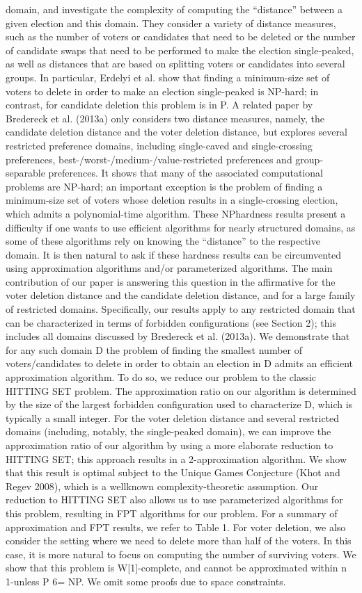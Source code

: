 \documentclass[11pt]{article}
\begin{document}
{domain, and investigate the complexity of computing the ``distance'' between a
given election and this domain. They consider a variety of distance measures,
such as the number of voters or candidates that need to be deleted or the number
of candidate swaps that need to be performed to make the election single-peaked,
as well as distances that are based on splitting voters or candidates into
several groups. In particular, Erdelyi et al. show that finding a minimum-size
set of voters to delete in order to make an election single-peaked is NP-hard; in
contrast, for candidate deletion this problem is in P. A related paper by
Bredereck et al. (2013a) only considers two distance measures, namely, the
candidate deletion distance and the voter deletion distance, but explores several
restricted preference domains, including single-caved and single-crossing
preferences, best-/worst-/medium-/value-restricted preferences and
group-separable preferences. It shows that many of the associated computational
problems are NP-hard; an important exception is the problem of finding a
minimum-size set of voters whose deletion results in a single-crossing election,
which admits a polynomial-time algorithm. These NPhardness results present a
difficulty if one wants to use efficient algorithms for nearly structured
domains, as some of these algorithms rely on knowing the ``distance'' to the
respective domain. It is then natural to ask if these hardness results can be
circumvented using approximation algorithms and/or parameterized algorithms. The
main contribution of our paper is answering this question in the affirmative for
the voter deletion distance and the candidate deletion distance, and for a large
family of restricted domains. Specifically, our results apply to any restricted
domain that can be characterized in terms of forbidden configurations (see
Section 2); this includes all domains discussed by Bredereck et al. (2013a). We
demonstrate that for any such domain D the problem of finding the smallest number
of voters/candidates to delete in order to obtain an election in D admits an
efficient approximation algorithm. To do so, we reduce our problem to the classic
HITTING SET problem. The approximation ratio on our algorithm is determined by
the size of the largest forbidden configuration used to characterize D, which is
typically a small integer. For the voter deletion distance and several restricted
domains (including, notably, the single-peaked domain), we can improve the
approximation ratio of our algorithm by using a more elaborate reduction to
HITTING SET; this approach results in a 2-approximation algorithm. We show that
this result is optimal subject to the Unique Games Conjecture (Khot and Regev
2008), which is a wellknown complexity-theoretic assumption. Our reduction to
HITTING SET also allows us to use parameterized algorithms for this problem,
resulting in FPT algorithms for our problem. For a summary of approximation and
FPT results, we refer to Table 1. For voter deletion, we also consider the
setting where we need to delete more than half of the voters. In this case, it is
more natural to focus on computing the number of surviving voters. We show that
this problem is W[1]-complete, and cannot be approximated within n 1-unless P 6=
NP. We omit some proofs due to space constraints.
}
\end{document}

